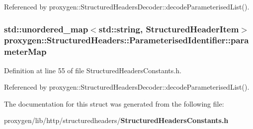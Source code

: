 Referenced by proxygen\+::\+Structured\+Headers\+Decoder\+::decode\+Parameterised\+List().

\subsubsection[{parameter\+Map}]{\setlength{\rightskip}{0pt plus 5cm}std\+::unordered\+\_\+map$<$std\+::string, {\bf Structured\+Header\+Item}$>$ proxygen\+::\+Structured\+Headers\+::\+Parameterised\+Identifier\+::parameter\+Map}\label{structproxygen_1_1StructuredHeaders_1_1ParameterisedIdentifier_a80347981b57fe3827c08ed0f2a3dd295}


Definition at line 55 of file Structured\+Headers\+Constants.\+h.



Referenced by proxygen\+::\+Structured\+Headers\+Decoder\+::decode\+Parameterised\+List().



The documentation for this struct was generated from the following file\+:\begin{DoxyCompactItemize}
\item 
proxygen/lib/http/structuredheaders/{\bf Structured\+Headers\+Constants.\+h}\end{DoxyCompactItemize}
